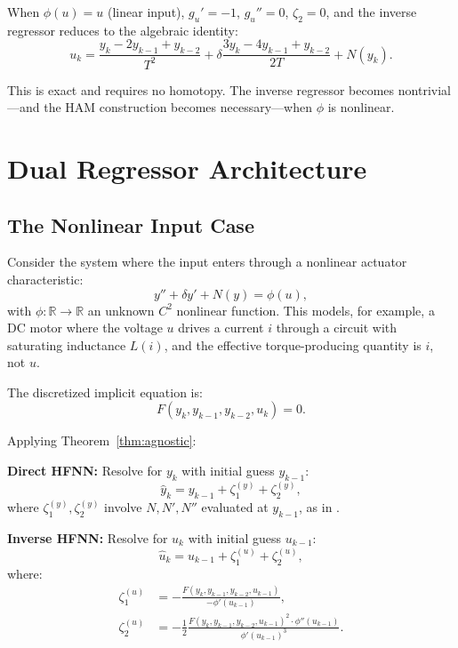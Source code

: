 \documentclass[lettersize,journal]{IEEEtran}
\begin{document}
When $\phi(u) = u$ (linear input), $g_u' = -1$, $g_u'' = 0$, $\zeta_2 = 0$, and the inverse regressor reduces to the algebraic identity:
\begin{equation}
\label{eq:trivial_inverse}
u_k = \frac{y_k - 2y_{k-1} + y_{k-2}}{T^2} + \delta \frac{3y_k - 4y_{k-1} + y_{k-2}}{2T} + N(y_k).
\end{equation}

This is exact and requires no homotopy. The inverse regressor becomes nontrivial---and the HAM construction becomes necessary---when $\phi$ is nonlinear.

\section{Dual Regressor Architecture}
\label{sec:dual}

\subsection{The Nonlinear Input Case}

Consider the system where the input enters through a nonlinear actuator characteristic:
\begin{equation}
\label{eq:ode_nonlinear_input}
y'' + \delta y' + N(y) = \phi(u),
\end{equation}
with $\phi: \mathbb{R} \to \mathbb{R}$ an unknown $C^2$ nonlinear function. This models, for example, a DC motor where the voltage $u$ drives a current $i$ through a circuit with saturating inductance $L(i)$, and the effective torque-producing quantity is $i$, not $u$.

The discretized implicit equation is:
\begin{equation}
\label{eq:F_dual}
F(y_k, y_{k-1}, y_{k-2}, u_k) = 0.
\end{equation}

Applying Theorem~\ref{thm:agnostic}:

\textbf{Direct HFNN:} Resolve for $y_k$ with initial guess $y_{k-1}$:
\begin{equation}
\label{eq:direct}
\hat{y}_k = y_{k-1} + \zeta_1^{(y)} + \zeta_2^{(y)},
\end{equation}
where $\zeta_1^{(y)}, \zeta_2^{(y)}$ involve $N, N', N''$ evaluated at $y_{k-1}$, as in \cite{rodrigo2025hfnn}.

\textbf{Inverse HFNN:} Resolve for $u_k$ with initial guess $u_{k-1}$:
\begin{equation}
\label{eq:inverse}
\hat{u}_k = u_{k-1} + \zeta_1^{(u)} + \zeta_2^{(u)},
\end{equation}
where:
\begin{align}
\zeta_1^{(u)} &= -\frac{F(y_k, y_{k-1}, y_{k-2}, u_{k-1})}{-\phi'(u_{k-1})}, \label{eq:z1u} \\
\zeta_2^{(u)} &= -\frac{1}{2} \frac{F(y_k, y_{k-1}, y_{k-2}, u_{k-1})^2 \cdot \phi''(u_{k-1})}{\phi'(u_{k-1})^3}. \label{eq:z2u}
\end{align}
\end{document}
